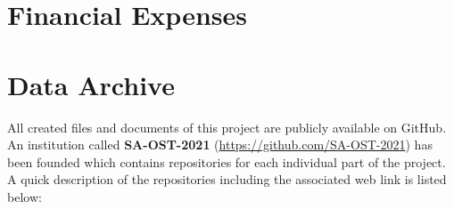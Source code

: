\begin{adjustwidth}{0.23cm}{0cm} \hfuzz=7.0pt \vfuzz=19.0pt
\end{adjustwidth}
\newpage

\section{Financial Expenses} \label{Financial Expenses}
\newpage


\section{Data Archive} \label{Data Archive}
All created files and documents of this project are publicly available on GitHub. An institution called \textbf{SA-OST-2021} (\url{https://github.com/SA-OST-2021}) has been founded which contains repositories for each individual part of the project.
A quick description of the repositories including the associated web link is listed below:


